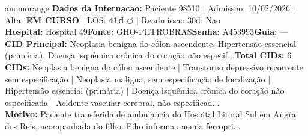 \documentclass[a4paper,10pt]{article}
\begin{document}
\begin{anomalycard}[Internacao 165070 | GHO-PETROBRAS | ALTO (z=4.56)]{anomorange}
\textbf{Dados da Internacao:} Paciente 98510 $\mid$ Admissao: 10/02/2026 $\mid$ Alta: \textcolor{anomorange}{\textbf{EM CURSO}} $\mid$ LOS: \textbf{41d \textcolor{anomorange}{$\circlearrowleft$}} $\mid$ Readmissao 30d: Nao\\
\textbf{Hospital:} Hospital 49\quad\textbf{Fonte:} GHO-PETROBRAS\quad\textbf{Senha:} A453993\quad\textbf{Guia:} ---\\
\textbf{CID Principal:} {\small Neoplasia benigna do cólon ascendente, Hipertensão essencial (primária), Doença isquêmica crônica do coração não especif...}\quad\textbf{Total CIDs:} 6\\

\textbf{CIDs:} {\scriptsize Neoplasia benigna do cólon ascendente | Transtorno depressivo recorrente sem especificação | Neoplasia maligna, sem especificação de localização | Hipertensão essencial (primária) | Doença isquêmica crônica do coração não especificada | Acidente vascular cerebral, não especificad...}\\

\textbf{Motivo:} {\scriptsize Paciente transferida de ambulancia do Hospital Litoral Sul em Angra dos Reis, acompanhada do filho.  Fiho informa anemia ferropri...}\\


\end{anomalycard}
\end{document}
